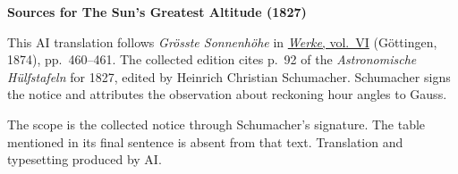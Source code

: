 \clearpage\thispagestyle{empty}
\begin{center}\textbf{Sources for The Sun’s Greatest Altitude (1827)}\end{center}
\noindent This AI translation follows \textit{Grösste Sonnenhöhe} in \href{https://gdz.sub.uni-goettingen.de/id/PPN236007467}{\textit{Werke}, vol.~VI} (Göttingen, 1874), pp.~460--461. The collected edition cites p.~92 of the \textit{Astronomische Hülfstafeln} for 1827, edited by Heinrich Christian Schumacher. Schumacher signs the notice and attributes the observation about reckoning hour angles to Gauss.
\par\smallskip\noindent The scope is the collected notice through Schumacher’s signature. The table mentioned in its final sentence is absent from that text. Translation and typesetting produced by AI.
\clearpage
